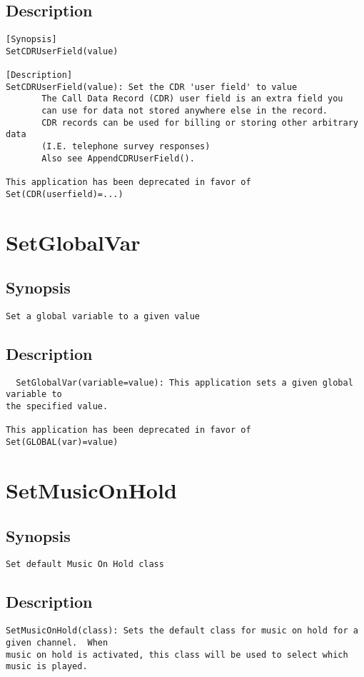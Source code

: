 \subsection{Description}
\begin{verbatim}
[Synopsis]
SetCDRUserField(value)

[Description]
SetCDRUserField(value): Set the CDR 'user field' to value
       The Call Data Record (CDR) user field is an extra field you
       can use for data not stored anywhere else in the record.
       CDR records can be used for billing or storing other arbitrary data
       (I.E. telephone survey responses)
       Also see AppendCDRUserField().

This application has been deprecated in favor of Set(CDR(userfield)=...)

\end{verbatim}


\section{SetGlobalVar}
\subsection{Synopsis}
\begin{verbatim}
Set a global variable to a given value
\end{verbatim}
\subsection{Description}
\begin{verbatim}
  SetGlobalVar(variable=value): This application sets a given global variable to
the specified value.

This application has been deprecated in favor of Set(GLOBAL(var)=value)

\end{verbatim}


\section{SetMusicOnHold}
\subsection{Synopsis}
\begin{verbatim}
Set default Music On Hold class
\end{verbatim}
\subsection{Description}
\begin{verbatim}
SetMusicOnHold(class): Sets the default class for music on hold for a given channel.  When
music on hold is activated, this class will be used to select which
music is played.

\end{verbatim}


